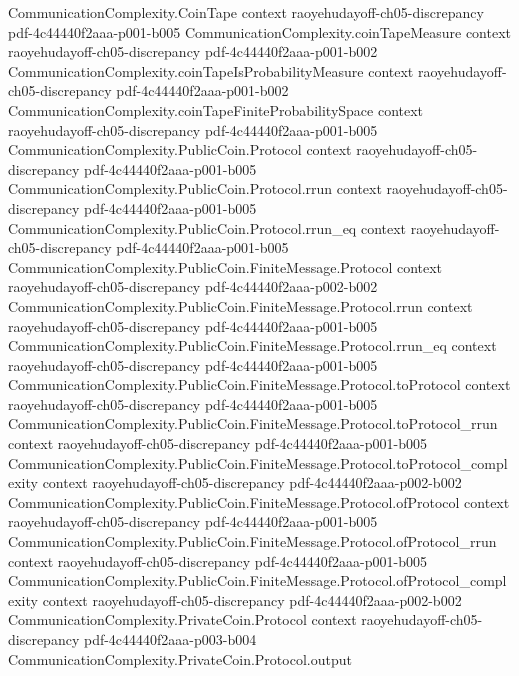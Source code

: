 \begin{lemma}
\proofstep
  {CommunicationComplexity.CoinTape}
  {context}
  {raoyehudayoff-ch05-discrepancy}
  {pdf-4c44440f2aaa-p001-b005}
\proofstep
  {CommunicationComplexity.coinTapeMeasure}
  {context}
  {raoyehudayoff-ch05-discrepancy}
  {pdf-4c44440f2aaa-p001-b002}
\proofstep
  {CommunicationComplexity.coinTapeIsProbabilityMeasure}
  {context}
  {raoyehudayoff-ch05-discrepancy}
  {pdf-4c44440f2aaa-p001-b002}
\proofstep
  {CommunicationComplexity.coinTapeFiniteProbabilitySpace}
  {context}
  {raoyehudayoff-ch05-discrepancy}
  {pdf-4c44440f2aaa-p001-b005}
\proofstep
  {CommunicationComplexity.PublicCoin.Protocol}
  {context}
  {raoyehudayoff-ch05-discrepancy}
  {pdf-4c44440f2aaa-p001-b005}
\proofstep
  {CommunicationComplexity.PublicCoin.Protocol.rrun}
  {context}
  {raoyehudayoff-ch05-discrepancy}
  {pdf-4c44440f2aaa-p001-b005}
\proofstep
  {CommunicationComplexity.PublicCoin.Protocol.rrun_eq}
  {context}
  {raoyehudayoff-ch05-discrepancy}
  {pdf-4c44440f2aaa-p001-b005}
\proofstep
  {CommunicationComplexity.PublicCoin.FiniteMessage.Protocol}
  {context}
  {raoyehudayoff-ch05-discrepancy}
  {pdf-4c44440f2aaa-p002-b002}
\proofstep
  {CommunicationComplexity.PublicCoin.FiniteMessage.Protocol.rrun}
  {context}
  {raoyehudayoff-ch05-discrepancy}
  {pdf-4c44440f2aaa-p001-b005}
\proofstep
  {CommunicationComplexity.PublicCoin.FiniteMessage.Protocol.rrun_eq}
  {context}
  {raoyehudayoff-ch05-discrepancy}
  {pdf-4c44440f2aaa-p001-b005}
\proofstep
  {CommunicationComplexity.PublicCoin.FiniteMessage.Protocol.toProtocol}
  {context}
  {raoyehudayoff-ch05-discrepancy}
  {pdf-4c44440f2aaa-p001-b005}
\proofstep
  {CommunicationComplexity.PublicCoin.FiniteMessage.Protocol.toProtocol_rrun}
  {context}
  {raoyehudayoff-ch05-discrepancy}
  {pdf-4c44440f2aaa-p001-b005}
\proofstep
  {CommunicationComplexity.PublicCoin.FiniteMessage.Protocol.toProtocol_complexity}
  {context}
  {raoyehudayoff-ch05-discrepancy}
  {pdf-4c44440f2aaa-p002-b002}
\proofstep
  {CommunicationComplexity.PublicCoin.FiniteMessage.Protocol.ofProtocol}
  {context}
  {raoyehudayoff-ch05-discrepancy}
  {pdf-4c44440f2aaa-p001-b005}
\proofstep
  {CommunicationComplexity.PublicCoin.FiniteMessage.Protocol.ofProtocol_rrun}
  {context}
  {raoyehudayoff-ch05-discrepancy}
  {pdf-4c44440f2aaa-p001-b005}
\proofstep
  {CommunicationComplexity.PublicCoin.FiniteMessage.Protocol.ofProtocol_complexity}
  {context}
  {raoyehudayoff-ch05-discrepancy}
  {pdf-4c44440f2aaa-p002-b002}
\proofstep
  {CommunicationComplexity.PrivateCoin.Protocol}
  {context}
  {raoyehudayoff-ch05-discrepancy}
  {pdf-4c44440f2aaa-p003-b004}
\proofstep
  {CommunicationComplexity.PrivateCoin.Protocol.output}

\end{lemma}
